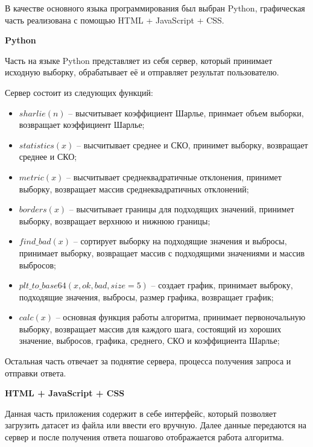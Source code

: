 \documentclass[a4paper,14pt]{article}
\begin{document}
В качестве основного языка программирования был выбран Python, графическая часть реализована с помощью HTML + JavaScript + CSS.

\textbf{Python}

Часть на языке Python представляет из себя сервер, который принимает исходную выборку, обрабатывает её и отправляет результат пользователю.

Сервер состоит из следующих функций:

\begin{itemize}
	\item $sharlie(n)$ -- высчитывает коэффициент Шарлье, принмает объем выборки, возвращает коэффициент Шарлье;
	
	\item $statistics(x)$ -- высчитывает среднее и СКО, принимет выборку, возвращает среднее и СКО;
	
	\item $metric(x)$ -- высчитывает среднеквадратичные отклонения, принимет выборку, возвращает массив среднеквадратичных отклонений;
	
	\item $borders(x)$ -- высчитывает границы для подходящих значений, принимет выборку, возвращает верхнюю и нижнюю границы;
	
	\item $find\_bad(x)$ -- сортирует выборку на подходящие значения и выбросы, принимает выборку, возвращает массив с подходящими значениями и массив выбросов;
	
	\item $plt\_to\_base64(x, ok, bad, size=5)$ -- создает график, принимает выброку, подходящие значения, выбросы, размер графика, возвращает график;
	
	\item $calc(x)$ -- основная функция работы алгоритма, принимает первоночальную выборку, возвращает массив для каждого шага, состоящий из хороших значение, выбросов, графика, среднего, СКО и коэффициента Шарлье;
	
\end{itemize}

	Остальная часть отвечает за поднятие сервера, процесса получения запроса и отправки ответа.
	
\textbf{HTML + JavaScript + CSS}

	Данная часть приложения содержит в себе интерфейс, который позволяет загрузить датасет из файла или ввести его вручную. 
	Далее данные передаются на сервер и после получения ответа пошагово отображается работа алгоритма.
	
\end{document}
